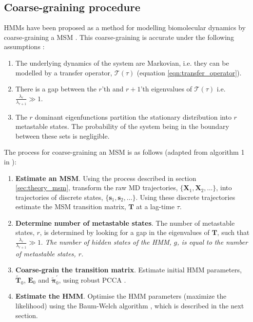 \subsection{Coarse-graining procedure}
HMMs have been proposed as a method for modelling biomolecular dynamics by coarse-graining a MSM \cite{noeProjectedHiddenMarkov2013a}. This coarse-graining is accurate under the following assumptions \cite{noeProjectedHiddenMarkov2013a}:
\begin{enumerate}
    \item The underlying dynamics of the system are Markovian, i.e. they can be modelled by a transfer operator, $\mathcal{T}(\tau)$ (equation \ref{eqn:transfer_operator}). 
    \item There is a gap between the $r$'th and $r+1$'th  eigenvalues of $\mathcal{T}(\tau)$ i.e. $\frac{\lambda_{r}}{\lambda_{r+1}} \gg 1$.\label{assump_two}
    \item The $r$ dominant eigenfunctions partition the stationary distribution into $r$ metastable states. The probability of the system being in the boundary between these sets is negligible. \label{assump_three}
\end{enumerate}

The process for coarse-graining an MSM is as follows (adapted from algorithm 1 in \cite{noeProjectedHiddenMarkov2013a}): 
\begin{enumerate}
    \item \textbf{Estimate an MSM}. Using the process described in section \ref{sec:theory_msm}, transform the raw MD trajectories, $\{\mathbf{X}_{1}, \mathbf{X}_{2}, \ldots\}$, into trajectories of discrete states, $\{\mathbf{s}_{1},\mathbf{s}_{2}, \ldots\}$. Using these discrete trajectories estimate the MSM transition matrix, $\mathbf{T}$ at a lag-time $\tau$. 
    \item \textbf{Determine number of metastable states}. The number of metastable states, $r$, is determined by looking for a gap in the eigenvalues of $\mathbf{T}$, such that  $\frac{\lambda_{r}}{\lambda_{r+1}} \gg 1$. \emph{The number of hidden states of the HMM, $g$, is equal to the number of metastable states, $r$}.\label{item:theory_nmetastable}
    \item \textbf{Coarse-grain the transition matrix}. Estimate initial HMM parameters, $\widetilde{\mathbf{T}}_{0}$,  $\mathbf{E}_{0}$ and $\widetilde{\bm{\pi}}^{\prime}_{0}$, using robust PCCA \cite{deuflhardRobustPerronCluster2005b}. 
    \item \textbf{Estimate the HMM}. Optimise the HMM parameters (maximize the likelihood) using the Baum-Welch algorithm \cite{baumMaximizationTechniqueOccurring1970,welch2003hidden}, which is described in the next section. 
\end{enumerate}

